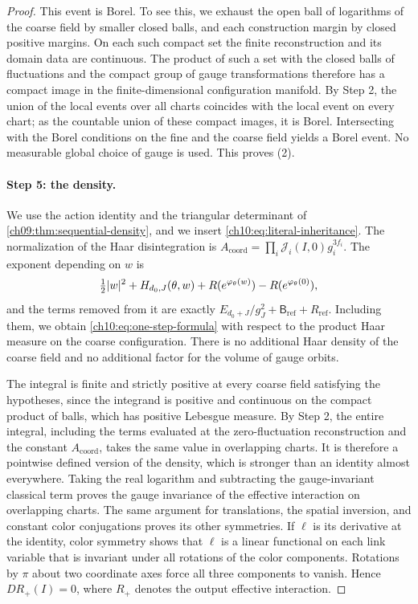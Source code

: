 \begin{proof}
This event is Borel. To see this, we exhaust the open ball of logarithms of the coarse field by smaller closed balls, and each construction margin by closed positive margins. On each such compact set the finite reconstruction and its domain data are continuous. The product of such a set with the closed balls of fluctuations and the compact group of gauge transformations therefore has a compact image in the finite-dimensional configuration manifold. By Step 2, the union of the local events over all charts coincides with the local event on every chart; as the countable union of these compact images, it is Borel. Intersecting with the Borel conditions on the fine and the coarse field yields a Borel event. No measurable global choice of gauge is used. This proves (2).

\paragraph{Step 5: the density.}
We use the action identity and the triangular determinant of \cref{ch09:thm:sequential-density}, and we insert \eqref{ch10:eq:literal-inheritance}. The normalization of the Haar disintegration is $A_{\mathrm{coord}}=\prod_i\mathcal J_i(I,0)g_i^{3f_i}$. The exponent depending on $w$ is
\[
 \tfrac12\lvert w\rvert^2+H_{d_0,J}(\theta,w)+R(e^{\varphi_\theta(w)})-R(e^{\varphi_\theta(0)}),
\]
and the terms removed from it are exactly $E_{d_0+J}/g_J^2+\mathsf B_{\mathrm{ref}}+R_{\mathrm{ref}}$. Including them, we obtain \eqref{ch10:eq:one-step-formula} with respect to the product Haar measure on the coarse configuration. There is no additional Haar density of the coarse field and no additional factor for the volume of gauge orbits.

The integral is finite and strictly positive at every coarse field satisfying the hypotheses, since the integrand is positive and continuous on the compact product of balls, which has positive Lebesgue measure. By Step 2, the entire integral, including the terms evaluated at the zero-fluctuation reconstruction and the constant $A_{\mathrm{coord}}$, takes the same value in overlapping charts. It is therefore a pointwise defined version of the density, which is stronger than an identity almost everywhere. Taking the real logarithm and subtracting the gauge-invariant classical term proves the gauge invariance of the effective interaction on overlapping charts. The same argument for translations, the spatial inversion, and constant color conjugations proves its other symmetries. If $\ell$ is its derivative at the identity, color symmetry shows that $\ell$ is a linear functional on each link variable that is invariant under all rotations of the color components. Rotations by $\pi$ about two coordinate axes force all three components to vanish. Hence $DR_+(I)=0$, where $R_+$ denotes the output effective interaction.


\end{proof}
